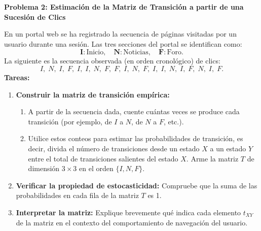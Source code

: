 \documentclass{article}
\begin{document}
\begin{problem}
\textbf{Problema 2: Estimación de la Matriz de Transición a partir de una Sucesión de Clics}

En un portal web se ha registrado la secuencia de páginas visitadas por un usuario durante una sesión. Las tres secciones del portal se identifican como:
\[
\textbf{I}: \text{Inicio}, \quad \textbf{N}: \text{Noticias}, \quad \textbf{F}: \text{Foro}.
\]
La siguiente es la secuencia observada (en orden cronológico) de clics:
\[
I,\; N,\; I,\; F,\; I,\; I,\; N,\; F,\; F,\; I,\; N,\; F,\; I,\; I,\; N,\; I,\; F,\; N,\; I,\; F.
\]
\textbf{Tareas:}
\begin{enumerate}
    \item \textbf{Construir la matriz de transición empírica:}  
    \begin{enumerate}
        \item A partir de la secuencia dada, cuente cuántas veces se produce cada transición (por ejemplo, de \(I\) a \(N\), de \(N\) a \(F\), etc.).
        \item Utilice estos conteos para estimar las probabilidades de transición, es decir, divida el número de transiciones desde un estado \(X\) a un estado \(Y\) entre el total de transiciones salientes del estado \(X\). Arme la matriz \(T\) de dimensión \(3 \times 3\) en el orden \(\{I, N, F\}\).
    \end{enumerate}

    \item \textbf{Verificar la propiedad de estocasticidad:}  
    Compruebe que la suma de las probabilidades en cada fila de la matriz \(T\) es 1.
    
    \item \textbf{Interpretar la matriz:}  
    Explique brevemente qué indica cada elemento \(t_{XY}\) de la matriz en el contexto del comportamiento de navegación del usuario.

    
\end{enumerate}

\end{problem}

\end{document}
